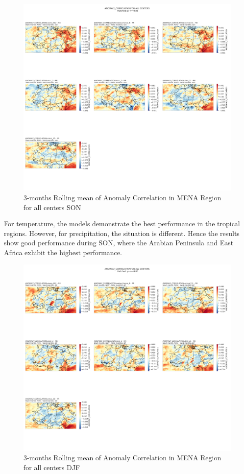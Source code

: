 \begin{figure}[H]
\centering
\includegraphics[scale=0.3]{plots/det/acc/ANOMALY_CORRELATION_son_RR.png}
\caption{3-months Rolling mean of Anomaly Correlation in MENA Region for all centers SON}
\end{figure}
For temperature, the models demonstrate the best performance in the tropical regions. However, for precipitation, the situation is different. Hence the results show good performance during SON, where the Arabian Peninsula and  East Africa exhibit the highest performance.
\begin{figure}[H]
\centering
\includegraphics[scale=0.3]{plots/det/acc/ANOMALY_CORRELATION_djf_RR.png}
\caption{3-months Rolling mean of Anomaly Correlation in MENA Region for all centers DJF}
\end{figure}

